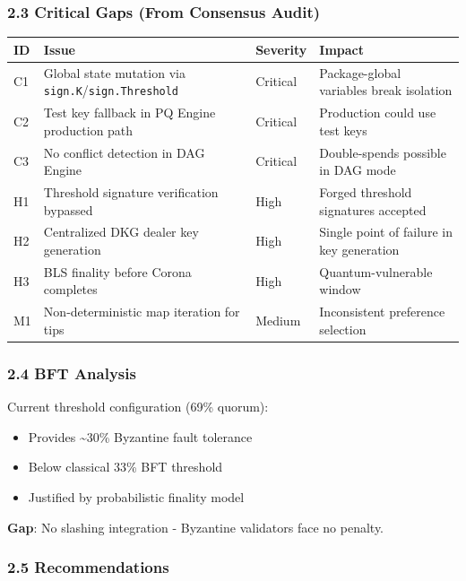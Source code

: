 \documentclass[
]{article}
\newcounter{none} %
\providecommand{\tightlist}{%
  \setlength{\itemsep}{0pt}\setlength{\parskip}{0pt}}
\begin{document}
\subsubsection{2.3 Critical Gaps (From Consensus
Audit)}\label{23-critical-gaps-from-consensus-audit}

{\def\LTcaptype{none} %
\begin{longtable}[]{@{}llll@{}}
\toprule\noalign{}
ID & Issue & Severity & Impact \\
\midrule\noalign{}
\endhead
\bottomrule\noalign{}
\endlastfoot
C1 & Global state mutation via \texttt{sign.K}/\texttt{sign.Threshold} &
Critical & Package-global variables break isolation \\
C2 & Test key fallback in PQ Engine production path & Critical &
Production could use test keys \\
C3 & No conflict detection in DAG Engine & Critical & Double-spends
possible in DAG mode \\
H1 & Threshold signature verification bypassed & High & Forged threshold
signatures accepted \\
H2 & Centralized DKG dealer key generation & High & Single point of
failure in key generation \\
H3 & BLS finality before Corona completes & High & Quantum-vulnerable
window \\
M1 & Non-deterministic map iteration for tips & Medium & Inconsistent
preference selection \\
\end{longtable}
}

\subsubsection{2.4 BFT Analysis}\label{24-bft-analysis}

Current threshold configuration (69\% quorum):

\begin{itemize}
\tightlist
\item
  Provides \textasciitilde30\% Byzantine fault tolerance
\item
  Below classical 33\% BFT threshold
\item
  Justified by probabilistic finality model
\end{itemize}

\textbf{Gap}: No slashing integration - Byzantine validators face no
penalty.

\subsubsection{2.5 Recommendations}\label{25-recommendations}
\end{document}
